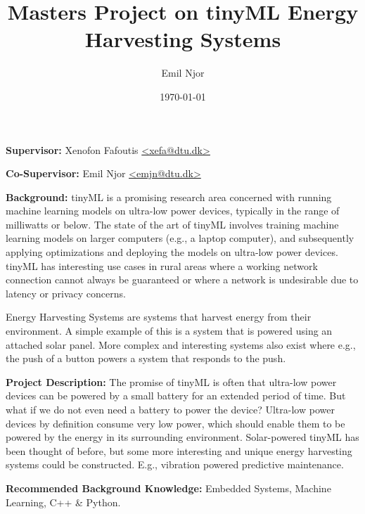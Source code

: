 \documentclass{article}
\author{Emil Njor}
\title{Masters Project on tinyML Energy Harvesting Systems}
\date{\today}
\begin{document}
\maketitle    
\textbf{Supervisor:} Xenofon Fafoutis \href{mailto:xefa@dtu.dk}{\textless{}xefa@dtu.dk\textgreater} 

\textbf{Co-Supervisor:} Emil Njor \href{mailto:emjn@dtu.dk}{\textless{}emjn@dtu.dk\textgreater} 

\textbf{Background:} tinyML is a promising research area concerned with running machine learning models on ultra-low power devices, typically in the range of milliwatts or below. 
The state of the art of tinyML involves training machine learning models on larger computers (e.g., a laptop computer), and subsequently applying optimizations and deploying the models on ultra-low power devices.
tinyML has interesting use cases in rural areas where a working network connection cannot always be guaranteed or where a network is undesirable due to latency or privacy concerns.

Energy Harvesting Systems are systems that harvest energy from their environment. 
A simple example of this is a system that is powered using an attached solar panel.
More complex and interesting systems also exist where e.g., the push of a button powers a system that responds to the push. 

\textbf{Project Description:} The promise of tinyML is often that ultra-low power devices can be powered by a small battery for an extended period of time.
But what if we do not even need a battery to power the device?
Ultra-low power devices by definition consume very low power, which should enable them to be powered by the energy in its surrounding environment. Solar-powered tinyML has been thought of before, but some more interesting and unique energy harvesting systems could be constructed. E.g., vibration powered predictive maintenance.

\textbf{Recommended Background Knowledge:} Embedded Systems, Machine Learning, C++ \& Python.
\end{document}
